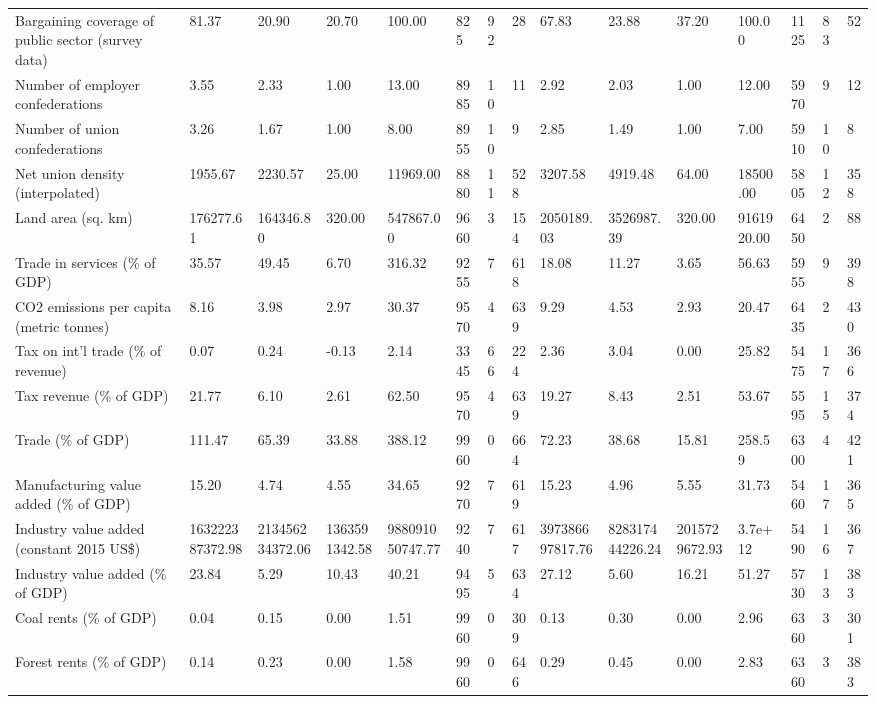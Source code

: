 \begin{longtable}{lllllllllllllll}
\addlinespace
Bargaining coverage of public sector (survey data) & 81.37 & 20.90 & 20.70 & 100.00 & 825 & 92 & 28 & 67.83 & 23.88 & 37.20 & 100.00 & 1125 & 83 & 52\\
Number of employer confederations & 3.55 & 2.33 & 1.00 & 13.00 & 8985 & 10 & 11 & 2.92 & 2.03 & 1.00 & 12.00 & 5970 & 9 & 12\\
Number of union confederations & 3.26 & 1.67 & 1.00 & 8.00 & 8955 & 10 & 9 & 2.85 & 1.49 & 1.00 & 7.00 & 5910 & 10 & 8\\
Net union density (interpolated) & 1955.67 & 2230.57 & 25.00 & 11969.00 & 8880 & 11 & 528 & 3207.58 & 4919.48 & 64.00 & 18500.00 & 5805 & 12 & 358\\
Land area (sq. km) & 176277.61 & 164346.80 & 320.00 & 547867.00 & 9660 & 3 & 154 & 2050189.03 & 3526987.39 & 320.00 & 9161920.00 & 6450 & 2 & 88\\
\addlinespace
Trade in services (\% of GDP) & 35.57 & 49.45 & 6.70 & 316.32 & 9255 & 7 & 618 & 18.08 & 11.27 & 3.65 & 56.63 & 5955 & 9 & 398\\
CO2 emissions per capita (metric tonnes) & 8.16 & 3.98 & 2.97 & 30.37 & 9570 & 4 & 639 & 9.29 & 4.53 & 2.93 & 20.47 & 6435 & 2 & 430\\
Tax on int'l trade (\% of revenue) & 0.07 & 0.24 & -0.13 & 2.14 & 3345 & 66 & 224 & 2.36 & 3.04 & 0.00 & 25.82 & 5475 & 17 & 366\\
Tax revenue (\% of GDP) & 21.77 & 6.10 & 2.61 & 62.50 & 9570 & 4 & 639 & 19.27 & 8.43 & 2.51 & 53.67 & 5595 & 15 & 374\\
Trade (\% of GDP) & 111.47 & 65.39 & 33.88 & 388.12 & 9960 & 0 & 664 & 72.23 & 38.68 & 15.81 & 258.59 & 6300 & 4 & 421\\
\addlinespace
Manufacturing value added (\% of GDP) & 15.20 & 4.74 & 4.55 & 34.65 & 9270 & 7 & 619 & 15.23 & 4.96 & 5.55 & 31.73 & 5460 & 17 & 365\\
Industry value added (constant 2015 US\$) & 163222387372.98 & 213456234372.06 & 1363591342.58 & 988091050747.77 & 9240 & 7 & 617 & 397386697817.76 & 828317444226.24 & 2015729672.93 & 3.7e+12 & 5490 & 16 & 367\\
Industry value added (\% of GDP) & 23.84 & 5.29 & 10.43 & 40.21 & 9495 & 5 & 634 & 27.12 & 5.60 & 16.21 & 51.27 & 5730 & 13 & 383\\
Coal rents (\% of GDP) & 0.04 & 0.15 & 0.00 & 1.51 & 9960 & 0 & 309 & 0.13 & 0.30 & 0.00 & 2.96 & 6360 & 3 & 301\\
Forest rents (\% of GDP) & 0.14 & 0.23 & 0.00 & 1.58 & 9960 & 0 & 646 & 0.29 & 0.45 & 0.00 & 2.83 & 6360 & 3 & 383\\

\end{longtable}
